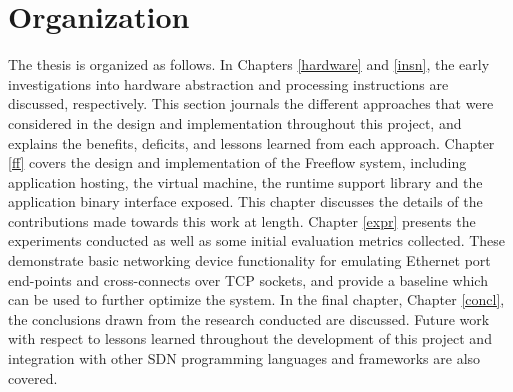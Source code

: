 \section{Organization}
\label{intro:map}
The thesis is organized as follows. In Chapters \ref{hardware} and \ref{insn}, the early investigations into
hardware abstraction and processing instructions are discussed,
respectively. This section journals the different approaches that were
considered in the design and implementation throughout this project, and
explains the benefits, deficits, and lessons learned from each approach.
Chapter \ref{ff} covers the design and implementation of the Freeflow system,
including application hosting, the virtual machine, the runtime support
library and the application binary interface exposed. This chapter discusses
the details of the contributions made towards this work at length.
Chapter \ref{expr} presents the experiments conducted as well as some initial
evaluation metrics collected. These demonstrate basic networking device
functionality for emulating Ethernet port end-points and cross-connects over
TCP sockets, and provide a baseline which can be used to further optimize the
system.
In the final chapter, Chapter \ref{concl}, the conclusions drawn from the
research conducted are discussed. Future work with respect to lessons learned
throughout the development of this project and integration with other SDN
programming languages and frameworks are also covered.

